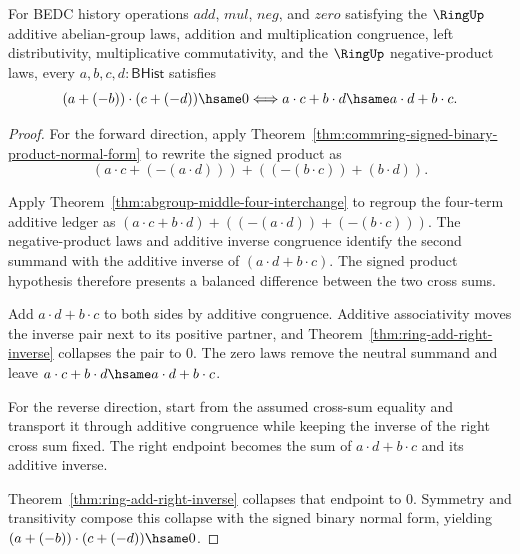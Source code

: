 \begin{theorem}
\label{thm:commring-signed-product-zero-exact}
For BEDC history operations $add$, $mul$, $neg$, and $zero$ satisfying the
$\RingUp$ additive abelian-group laws, addition and multiplication
congruence, left distributivity, multiplicative commutativity, and the
$\RingUp$ negative-product laws, every $a,b,c,d : \mathsf{BHist}$ satisfies
$$
(a+(-b))\cdot(c+(-d))\hsame0
\Longleftrightarrow
a\cdot c+b\cdot d\hsame a\cdot d+b\cdot c .
$$
\end{theorem}
\begin{proof}
For the forward direction, apply
Theorem~\ref{thm:commring-signed-binary-product-normal-form} to rewrite the
signed product as
$$
(a\cdot c+(-(a\cdot d)))+((-(b\cdot c))+(b\cdot d)).
$$

Apply Theorem~\ref{thm:abgroup-middle-four-interchange} to regroup the
four-term additive ledger as
$(a\cdot c+b\cdot d)+((-(a\cdot d))+(-(b\cdot c)))$. The negative-product
laws and additive inverse congruence identify the second summand with the
additive inverse of $(a\cdot d+b\cdot c)$. The signed product hypothesis
therefore presents a balanced difference between the two cross sums.

Add $a\cdot d+b\cdot c$ to both sides by additive congruence. Additive
associativity moves the inverse pair next to its positive partner, and
Theorem~\ref{thm:ring-add-right-inverse} collapses the pair to $0$. The zero
laws remove the neutral summand and leave
$a\cdot c+b\cdot d\hsame a\cdot d+b\cdot c$.

For the reverse direction, start from the assumed cross-sum equality and
transport it through additive congruence while keeping the inverse of the
right cross sum fixed. The right endpoint becomes the sum of
$a\cdot d+b\cdot c$ and its additive inverse.

Theorem~\ref{thm:ring-add-right-inverse} collapses that endpoint to $0$.
Symmetry and transitivity compose this collapse with the signed binary
normal form, yielding
$ (a+(-b))\cdot(c+(-d))\hsame0 $.
\end{proof}

